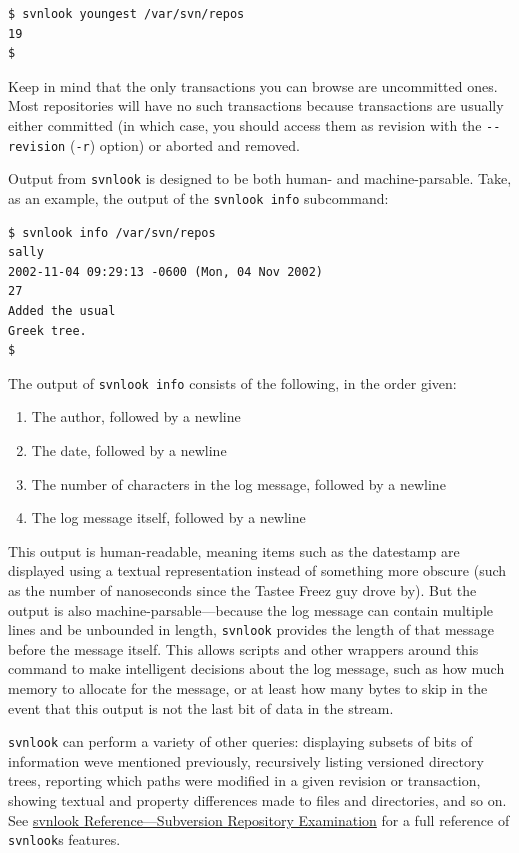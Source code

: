\begin{verbatim}
$ svnlook youngest /var/svn/repos
19
$
\end{verbatim}

Keep in mind that the only transactions you can browse are uncommitted
ones. Most repositories will have no such transactions because
transactions are usually either committed (in which case, you should
access them as revision with the \texttt{-\/-revision} (\texttt{-r})
option) or aborted and removed.

Output from \texttt{svnlook} is designed to be both human- and
machine-parsable. Take, as an example, the output of the
\texttt{svnlook\ info} subcommand:

\begin{verbatim}
$ svnlook info /var/svn/repos
sally
2002-11-04 09:29:13 -0600 (Mon, 04 Nov 2002)
27
Added the usual
Greek tree.
$
\end{verbatim}

The output of \texttt{svnlook\ info} consists of the following, in the
order given:

\begin{enumerate}
\def\labelenumi{\arabic{enumi}.}
\item
  The author, followed by a newline
\item
  The date, followed by a newline
\item
  The number of characters in the log message, followed by a newline
\item
  The log message itself, followed by a newline
\end{enumerate}

This output is human-readable, meaning items such as the datestamp are
displayed using a textual representation instead of something more
obscure (such as the number of nanoseconds since the Tastee Freez guy
drove by). But the output is also machine-parsable---because the log
message can contain multiple lines and be unbounded in length,
\texttt{svnlook} provides the length of that message before the message
itself. This allows scripts and other wrappers around this command to
make intelligent decisions about the log message, such as how much
memory to allocate for the message, or at least how many bytes to skip
in the event that this output is not the last bit of data in the stream.

\texttt{svnlook} can perform a variety of other queries: displaying
subsets of bits of information we\textquotesingle ve mentioned
previously, recursively listing versioned directory trees, reporting
which paths were modified in a given revision or transaction, showing
textual and property differences made to files and directories, and so
on. See \hyperref[svn.ref.svnlook]{svnlook Reference---Subversion
Repository Examination} for a full reference of
\texttt{svnlook}\textquotesingle s features.

